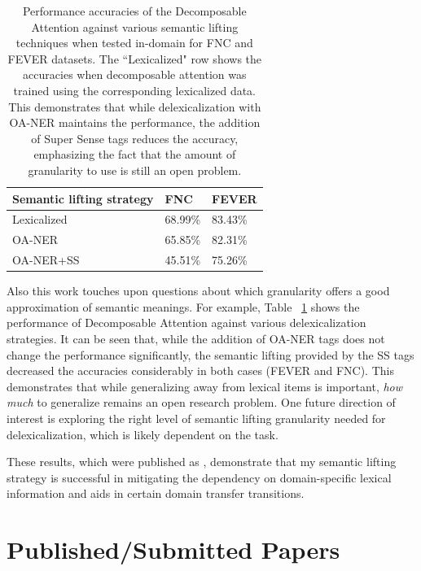 \documentclass{article}
\begin{document}
\begin{table}[h!]
\begin{center}
\begin{tabular}{|p{20mm}|p{9mm}|p{10mm}|}
 \hline
\textbf{Semantic lifting strategy} & \textbf{FNC}  & \textbf{FEVER}  \\ 
\hline
Lexicalized &68.99\% &83.43\% \\
OA-NER &65.85\% &82.31\%\\
OA-NER+SS & 45.51\% &75.26\%\\
\hline
\end{tabular}
\end{center}
    \caption{Performance accuracies of the Decomposable Attention against various semantic lifting techniques when tested in-domain for FNC and FEVER datasets. The ``Lexicalized" row shows the accuracies when decomposable attention was trained using the corresponding lexicalized data. This demonstrates that while delexicalization with OA-NER maintains the performance, the addition of Super Sense tags reduces the accuracy, emphasizing the fact that the amount of granularity to use is still an open problem.}
    \label{sstag}
\end{table}


Also this work touches upon questions about which granularity offers a good approximation of semantic meanings. For example, Table ~\ref{sstag} shows the performance of Decomposable Attention against various delexicalization strategies. It can be seen that, while the addition of OA-NER tags does not change the performance significantly, the semantic lifting provided by the SS tags decreased the accuracies considerably in both cases (FEVER and FNC).  This demonstrates that while generalizing away from lexical items is important, {\em how much} to generalize remains an open research problem. One future direction of interest is exploring the right level of semantic lifting granularity needed for delexicalization, which is likely dependent on the task. 



These results, which were published as \citep*{emnlp2019sandeep}, demonstrate that my semantic lifting strategy is successful in mitigating the dependency on domain-specific lexical information and aids in certain domain transfer transitions. 

\section{Published/Submitted Papers}
\end{document}
